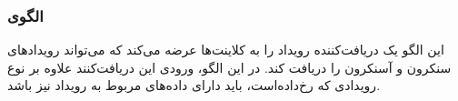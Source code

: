\subsubsection{الگوی }
\label{smSingleEvRecSec}
\begin{RTL}
این الگو یک دریافت‌کننده رویداد را به کلاینت‌ها عرضه می‌کند که می‌تواند رویدادهای
سنکرون و آسنکرون را دریافت کند. در این الگو، ورودی این دریافت‌کنند علاوه بر
نوع رویدادی که رخ‌داده‌است، باید دارای داده‌های مربوط به رویداد نیز باشد. 
\end{RTL}